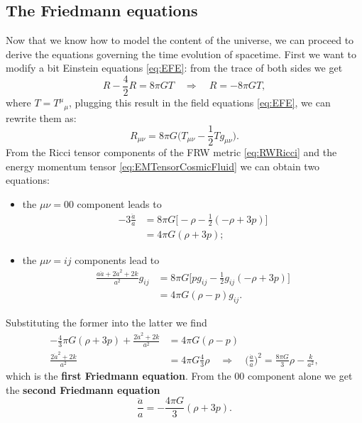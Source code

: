 \subsection{The Friedmann equations}
Now that we know how to model the content of the universe, we can proceed to derive the equations governing the time evolution of spacetime. First we want to modify a bit Einstein equations \eqref{eq:EFE}: from the trace of both sides we get
\begin{equation*}
    R-\frac{4}{2}R=8\pi GT\quad\Rightarrow\quad R=-8\pi GT,
\end{equation*}
where $T=T^\mu\phantom{}_\mu$, plugging this result in the field equations \eqref{eq:EFE}, we can rewrite them as:\begin{equation*}
    R_{\mu\nu}=8\pi G\bigg(T_{\mu\nu}-\frac{1}{2}Tg_{\mu\nu}\bigg).
\end{equation*}
From the Ricci tensor components of the FRW metric \eqref{eq:RWRicci} and the energy momentum tensor \eqref{eq:EMTensorCosmicFluid} we can obtain two equations:
\begin{itemize}
    \item the $\mu\nu=00$ component leads to
    \begin{align*}
        -3\frac{\ddot a}{a}&=8\pi G\bigg[-\rho-\frac{1}{2}(-\rho+3p)\bigg]\\&=4\pi G(\rho+3p);
    \end{align*}
    \item the $\mu\nu=ij$ components lead to
    \begin{align*}
        \frac{a\ddot a+2\dot a^2+2k}{a^2}g_{ij}&=8\pi G\bigg[pg_{ij}-\frac{1}{2}g_{ij}(-\rho+3p)\bigg]\\&=4\pi G(\rho-p)g_{ij}.
    \end{align*}
\end{itemize}
Substituting the former into the latter we find
\begin{align}
   -\frac{4}{3}\pi G(\rho+3p) +\frac{2\dot a^2+2k}{a^2}&=4\pi G(\rho-p)\nonumber\\\frac{2\dot a^2+2k}{a^2}&=4\pi G\frac{4}{3}\rho\quad\Rightarrow\quad  \boxed{\bigg(\frac{\dot a }{a}\bigg)^2=\frac{8\pi G}{3}\rho-\frac{k}{a^2}}\label{eq:Friedmann1},
\end{align}
which is the \textbf{first Friedmann equation}. From the $00$ component alone we get the \textbf{second Friedmann equation}
\begin{equation}
    \label{eq:Friedmann2}\frac{\ddot a}{a}=-\frac{4\pi G}{3}(\rho+3p).
\end{equation}
